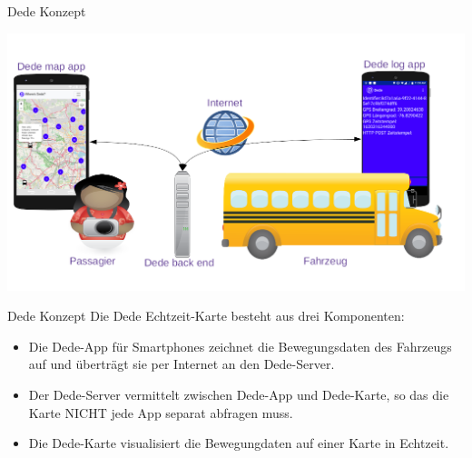 
\begin{frame}{Dede Konzept}
  \begin{center}
    \includegraphics[width=\paperwidth]{dede/dede-concept}
  \end{center}
\end{frame}

\begin{frame}{Dede Konzept}
  Die Dede Echtzeit-Karte besteht aus drei Komponenten:
  \begin{itemize}
  \item Die Dede-App für Smartphones zeichnet die Bewegungsdaten des Fahrzeugs auf und überträgt sie per Internet an den Dede-Server.
  \item Der Dede-Server vermittelt zwischen Dede-App und Dede-Karte, so das die Karte NICHT jede App separat abfragen muss.
  \item Die Dede-Karte visualisiert die Bewegungdaten auf einer Karte in Echtzeit.
  \end{itemize}
\end{frame}
